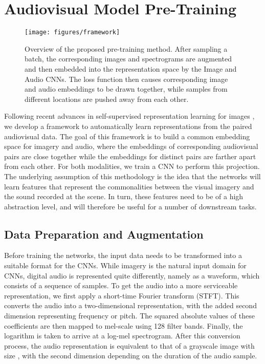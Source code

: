 \documentclass[journal]{IEEEtran}
\begin{document}
\section{Audiovisual Model Pre-Training}\label{sect:methodology}
\begin{figure}
    \centering
    \texttt{[image: figures/framework]}
    \caption{Overview of the proposed pre-training method. After sampling a batch,
        the corresponding images and spectrograms are augmented and then embedded into the
        representation space by the Image and Audio CNNs.
        The loss function then causes corresponding
        image and audio embeddings to be drawn together,
        while samples from different locations are pushed away from each other.
    }
    \label{fig:framework}
\end{figure}
Following recent advances in self-supervised representation learning
for images \cite{simclr,he_momentum_2020},
we develop a framework to automatically learn representations from the paired audiovisual data.
The goal of this framework is to build a common embedding space for imagery and audio,
where the embeddings of corresponding audiovisual pairs are close together while
the embeddings for distinct pairs are farther apart from each other.
For both modalities, we train a CNN to perform this projection.
The underlying assumption of this methodology is the idea that the networks will learn features that
represent the commonalities between the visual imagery and the sound recorded at the scene.
In turn, these features need to be of a high abstraction level,
and will therefore be useful for a number of downstream tasks.

\subsection{Data Preparation and Augmentation}
Before training the networks,
the input data needs to be transformed into a suitable format for the CNNs.
While imagery is the natural input domain for CNNs,
digital audio is represented quite differently,
namely as a waveform, which consists of a sequence of samples.
To get the audio into a more serviceable representation,
we first apply a short-time Fourier transform (STFT).
This converts the audio into a two-dimensional representation,
with the added second dimension representing frequency or pitch.
The squared absolute values of these coefficients are then mapped to mel-scale using 128 filter bands.
Finally, the logarithm is taken to arrive at a log-mel spectrogram.
After this conversion process, the audio representation is equivalent to that of a grayscale
image with size ,
with the second dimension  depending on the duration of the audio sample.
\end{document}
